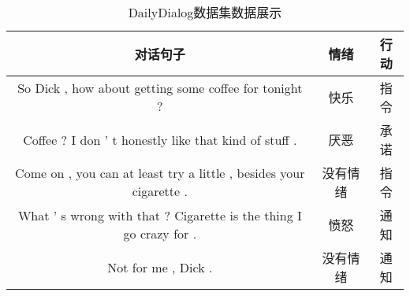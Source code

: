 \begin{table}[!ht]
	\caption{DailyDialog数据集数据展示}
	\label{table:DailyDialog}
	\centering
	\begin{tabular*}{\textwidth}{c@{\extracolsep{\fill}}cc}
		\toprule
		\textbf{对话句子} & \textbf{情绪} & \textbf{行动} \\ \midrule
		So Dick , how about getting some coffee for tonight ? & 快乐 & 指令 \\ 
		Coffee ? I don ’ t honestly like that kind of stuff . & 厌恶 & 承诺 \\ 
		Come on , you can at least try a little , besides your cigarette . & 没有情绪 & 指令 \\ 
		What ’ s wrong with that ? Cigarette is the thing I go crazy for . & 愤怒 & 通知 \\ 
		Not for me , Dick . & 没有情绪 & 通知 \\ \bottomrule
	\end{tabular*}
\end{table}
